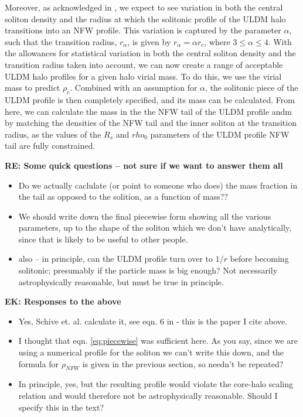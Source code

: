 \documentclass[a4paper,11pt]{article}
\newcommand{\ek}[1]{{{\bf \color{red} EK: #1}}}
\newcommand{\re}[1]{{{\bf \color{green} RE: #1}}}
\begin{document}
Moreover, as acknowledged in \cite{Robles:2018fur}, we expect to see variation in both the central soliton density and the radius at which the solitonic profile of the ULDM halo transitions into an NFW profile. This variation is captured by the parameter $\alpha$, such that the transition radius, $r_{\alpha}$, is given by $r_{\alpha} = \alpha r_c$, where $3 \leq \alpha \leq 4$.  With the allowances for statistical variation in both the central soliton density and the transition radius taken into account, we can now create a range of acceptable ULDM halo profiles for a given halo virial mass. To do this, we use the virial mass to predict $\rho_c$. Combined with an assumption for $\alpha$, the solitonic piece of the ULDM profile is then completely specified, and its mass can be calculated. From here, we can calculate the mass in the the NFW tail of the ULDM profile andm by matching the densities of the NFW tail and the inner soliton at the transition radius, as the values of the $R_s$ and $rho_0$ parameters of the ULDM profile NFW tail are fully constrained.  

\re{Some quick questions -- not sure if we want to answer them all 
\begin{itemize} 
\item Do we actually caclulate (or point to someone who does) the mass fraction in the tail as opposed to the solition, as a function of mass?? 
\item We should write down the final piecewise form showing all the various parameters, up to the shape of the soliton which we don't have analytically, since that is likely to be useful to other people. 
\item also -- in principle, can the ULDM profile turn over to $1/r$ before becoming solitonic; presumably if the particle mass is big enough?  Not necessarily astrophysically reasonable, but must be true in principle. 
\end{itemize}

}

\ek{Responses to the above 
\begin{itemize} 
\item Yes, Schive et. al. calculate it, see eqn. 6 in \cite{Schive:2014hza} - this is the paper I cite above. 
\item I thought that eqn. \ref{eq:piecewise} was sufficient here. As you say, since we are using a numerical profile for the soliton we can't write this down, and the formula for $\rho_{NFW}$ is given in the previous section, so needn't be repeated? 
\item In principle, yes, but the resulting profile would violate the core-halo scaling relation and would therefore not be astrophysically reasonable. Should I specify this in the text? 
\end{itemize}

}
\end{document}
